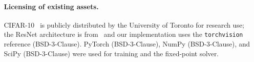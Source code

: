 \documentclass[11pt]{article}
\begin{document}
\paragraph{Licensing of existing assets.}
CIFAR-10~\citep{krizhevsky2009learning} is publicly distributed by the University of Toronto for research use; the ResNet architecture is from~\citet{heDeepResidualLearning2015} and our implementation uses the \texttt{torchvision} reference (BSD-3-Clause). PyTorch (BSD-3-Clause), NumPy (BSD-3-Clause), and SciPy (BSD-3-Clause) were used for training and the fixed-point solver.

% 
\end{document}
